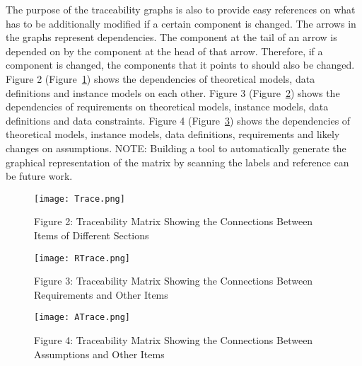 \documentclass[12pt]{article}
\begin{document}
The purpose of the traceability graphs is also to provide easy references on what has to be additionally modified if a certain component is changed. The arrows in the graphs represent dependencies. The component at the tail of an arrow is depended on by the component at the head of that arrow. Therefore, if a component is changed, the components that it points to should also be changed. Figure 2 (Figure~\ref{Figure:F2TMStCBIoDS}) shows the dependencies of theoretical models, data definitions and instance models on each other. Figure 3 (Figure~\ref{Figure:F3TMStCBRsaOI}) shows the dependencies of requirements on theoretical models, instance models, data definitions and data constraints. Figure 4 (Figure~\ref{Figure:F4TMStCBAsaOI}) shows the dependencies of theoretical models, instance models, data definitions, requirements and likely changes on assumptions.
NOTE: Building a tool to automatically generate the graphical representation of the matrix by scanning the labels and reference can be future work.
\begin{figure}
\begin{center}
\texttt{[image: Trace.png]}
\caption{Figure 2: Traceability Matrix Showing the Connections Between Items of Different Sections}
\label{Figure:F2TMStCBIoDS}
\end{center}
\end{figure}
\begin{figure}
\begin{center}
\texttt{[image: RTrace.png]}
\caption{Figure 3: Traceability Matrix Showing the Connections Between Requirements and Other Items}
\label{Figure:F3TMStCBRsaOI}
\end{center}
\end{figure}
\begin{figure}
\begin{center}
\texttt{[image: ATrace.png]}
\caption{Figure 4: Traceability Matrix Showing the Connections Between Assumptions and Other Items}
\label{Figure:F4TMStCBAsaOI}
\end{center}
\end{figure}
\end{document}

